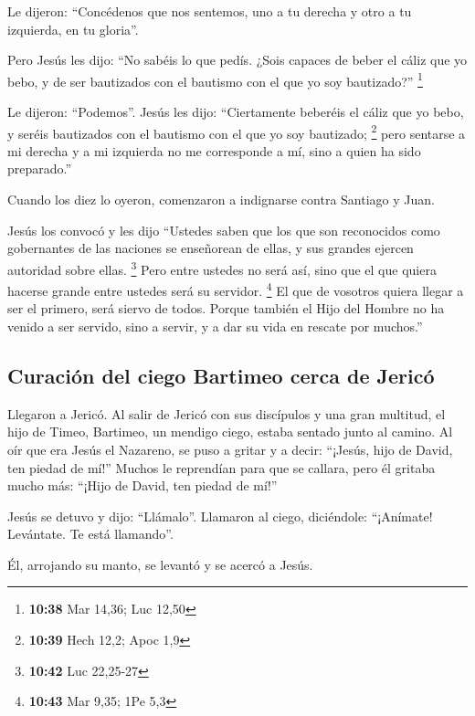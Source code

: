 \begin{paracol}{2}
 Le dijeron: ``Concédenos que nos sentemos, uno a tu
derecha y otro a tu izquierda, en tu gloria''.

 Pero Jesús les dijo: ``No sabéis lo que pedís. ¿Sois
capaces de beber el cáliz que yo bebo, y de ser bautizados con el
bautismo con el que yo soy bautizado?'' \footnote{\textbf{10:38} Mar
  14,36; Luc 12,50}

 Le dijeron: ``Podemos''. Jesús les dijo: ``Ciertamente
beberéis el cáliz que yo bebo, y seréis bautizados con el bautismo con
el que yo soy bautizado; \footnote{\textbf{10:39} Hech 12,2; Apoc 1,9}
 pero sentarse a mi derecha y a mi izquierda no me
corresponde a mí, sino a quien ha sido preparado.''

 Cuando los diez lo oyeron, comenzaron a indignarse
contra Santiago y Juan.

 Jesús los convocó y les dijo ``Ustedes saben que los que
son reconocidos como gobernantes de las naciones se enseñorean de ellas,
y sus grandes ejercen autoridad sobre ellas. \footnote{\textbf{10:42}
  Luc 22,25-27}  Pero entre ustedes no será así, sino que
el que quiera hacerse grande entre ustedes será su servidor. \footnote{\textbf{10:43}
  Mar 9,35; 1Pe 5,3}  El que de vosotros quiera llegar a
ser el primero, será siervo de todos.  Porque también el
Hijo del Hombre no ha venido a ser servido, sino a servir, y a dar su
vida en rescate por muchos.''

\hypertarget{curaciuxf3n-del-ciego-bartimeo-cerca-de-jericuxf3}{%
\subsection{Curación del ciego Bartimeo cerca de
Jericó}\label{curaciuxf3n-del-ciego-bartimeo-cerca-de-jericuxf3}}

 Llegaron a Jericó. Al salir de Jericó con sus discípulos
y una gran multitud, el hijo de Timeo, Bartimeo, un mendigo ciego,
estaba sentado junto al camino.  Al oír que era Jesús el
Nazareno, se puso a gritar y a decir: ``¡Jesús, hijo de David, ten
piedad de mí!''  Muchos le reprendían para que se
callara, pero él gritaba mucho más: ``¡Hijo de David, ten piedad de
mí!''

 Jesús se detuvo y dijo: ``Llámalo''. Llamaron al ciego,
diciéndole: ``¡Anímate! Levántate. Te está llamando''.

 Él, arrojando su manto, se levantó y se acercó a Jesús.


\end{paracol}
